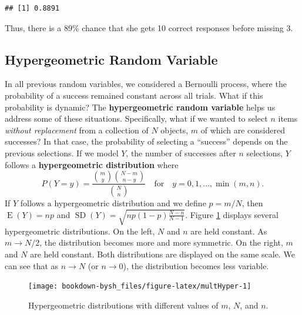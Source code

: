 \documentclass[
]{krantz}
\newcommand{\E}{\operatorname{E}}
\newcommand{\SD}{\operatorname{SD}}
\begin{document}
\begin{verbatim}
## [1] 0.8891
\end{verbatim}

Thus, there is a 89\% chance that she gets 10 correct responses before missing 3.

\hypertarget{hypergeometric-random-variable}{%
\subsection{Hypergeometric Random Variable}\label{hypergeometric-random-variable}}

In all previous random variables, we considered a Bernoulli process, where the probability of a success remained constant across all trials. What if this probability is dynamic? The \textbf{hypergeometric random variable} helps us address some of these situations. Specifically, what if we wanted to select \(n\) items \emph{without replacement} from a collection of \(N\) objects, \(m\) of which are considered successes? In that case, the probability of selecting a ``success'' depends on the previous selections.
If we model \(Y\), the number of successes after \(n\) selections, \(Y\) follows a \textbf{hypergeometric distribution} where
\begin{equation}
P(Y=y) = \frac{\binom{m}{y} \binom{N-m}{n-y}}{\binom{N}{n}} \quad \textrm{for} \quad y = 0, 1, \ldots, \min(m,n).
\label{eq:hyperGeoRV}
\end{equation}
If \(Y\) follows a hypergeometric distribution and we define \(p = m/N\), then \(\E(Y) = np\) and \(\SD(Y) = \sqrt{np(1-p)\frac{N-n}{N-1}}\). Figure \ref{fig:multHyper} displays several hypergeometric distributions. On the left, \(N\) and \(n\) are held constant. As \(m \rightarrow N/2\), the distribution becomes more and more symmetric. On the right, \(m\) and \(N\) are held constant. Both distributions are displayed on the same scale. We can see that as \(n \rightarrow N\) (or \(n \rightarrow 0\)), the distribution becomes less variable.



\begin{figure}

{\centering \texttt{[image: bookdown-bysh\_files/figure-latex/multHyper-1]} 

}

\caption{Hypergeometric distributions with different values of \(m\), \(N\), and \(n\).}\label{fig:multHyper}
\end{figure}
\end{document}
